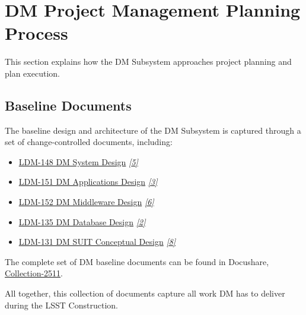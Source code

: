 \documentclass[DM,toc]{lsstdoc}
\newcommand{\sphinxcrossref}[1]{\emph{#1}}
\begin{document}
\section{DM Project Management Planning Process}
\label{\detokenize{index:dm-project-management-planning-process}}\label{\detokenize{index:baseline-plan}}
This section explains how the DM Subsystem approaches project planning and plan execution.


\subsection{Baseline Documents}
\label{\detokenize{index:baseline-documents}}
The baseline design and architecture of the DM Subsystem is captured through a set of change-controlled
documents, including:
\begin{itemize}
\item {}
\href{https://ls.st/LDM-148}{LDM-148 DM System Design} \label{\detokenize{index:id4}}{\hyperref[\detokenize{index:ldm-148}]{\sphinxcrossref{{[}5{]}}}}

\item {}
\href{https://ls.st/LDM-151}{LDM-151 DM Applications Design} \label{\detokenize{index:id5}}{\hyperref[\detokenize{index:ldm-151}]{\sphinxcrossref{{[}3{]}}}}

\item {}
\href{https://ls.st/LDM-152}{LDM-152 DM Middleware Design} \label{\detokenize{index:id6}}{\hyperref[\detokenize{index:ldm-152}]{\sphinxcrossref{{[}6{]}}}}

\item {}
\href{https://ls.st/LDM-135}{LDM-135 DM Database Design} \label{\detokenize{index:id7}}{\hyperref[\detokenize{index:ldm-135}]{\sphinxcrossref{{[}2{]}}}}

\item {}
\href{https://ls.st/LDM-131}{LDM-131 DM SUIT Conceptual Design} \label{\detokenize{index:id8}}{\hyperref[\detokenize{index:ldm-131}]{\sphinxcrossref{{[}8{]}}}}

\end{itemize}

The complete set of DM baseline documents can be found in Docushare, \href{https://ls.st/Collection-2511}{Collection-2511}.

All together, this collection of documents capture all work DM has to deliver during the LSST Construction.
\end{document}
